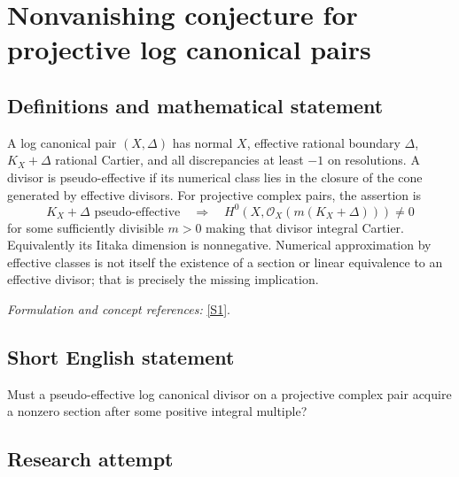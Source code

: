\documentclass[11pt,a4paper]{article}
\newcommand{\sref}[2]{\hyperlink{source:#1:#2}{[S#2]}}
\newif\ifshowcatalogue
\newcommand{\cataloguescope}[1]{\ifshowcatalogue
 \paragraph{Exact scope in the supplied catalogue.}
 \begin{quote}\small #1\end{quote}\fi}
\numberwithin{equation}{section}
\begin{document}
\setcounter{section}{193}
\clearpage
\section{\texorpdfstring{Nonvanishing conjecture for projective log canonical pairs}{Nonvanishing conjecture for projective log canonical pairs}}\label{194}
\subsection{Definitions and mathematical statement}
A log canonical pair $(X,\Delta)$ has normal $X$, effective rational boundary $\Delta$, $K_X+\Delta$ rational Cartier, and all discrepancies at least $-1$ on resolutions. A divisor is pseudo-effective if its numerical class lies in the closure of the cone generated by effective divisors. For projective complex pairs, the assertion is
\[
 K_X+\Delta\text{ pseudo-effective}
 \quad\Longrightarrow\quad
 H^0(X,\mathcal O_X(m(K_X+\Delta)))\ne0
\]
for some sufficiently divisible $m>0$ making that divisor integral Cartier. Equivalently its Iitaka dimension is nonnegative. Numerical approximation by effective classes is not itself the existence of a section or linear equivalence to an effective divisor; that is precisely the missing implication.
\par\smallskip\textit{Formulation and concept references:} \sref{194}{1}.
\cataloguescope{Let (X, Delta) be a projective log canonical pair over the complex numbers, with Delta a Q-divisor and K\_X+Delta Q-Cartier. If K\_X+Delta is pseudo-effective, prove that kappa(K\_X+Delta) >= 0; equivalently, some sufficiently divisible positive multiple of K\_X+Delta is linearly equivalent to an effective divisor.}
\subsection{Short English statement}
Must a pseudo-effective log canonical divisor on a projective complex pair acquire a nonzero section after some positive integral multiple?
\subsection{Research attempt}
\end{document}

